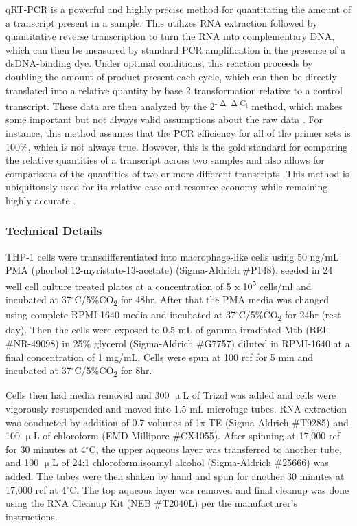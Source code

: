 qRT-PCR is a powerful and highly precise method for quantitating the amount of a transcript present in a sample. This utilizes RNA extraction followed by quantitative reverse transcription to turn the RNA into complementary DNA, which can then be measured by standard PCR amplification in the presence of a dsDNA-binding dye. Under optimal conditions, this reaction proceeds by doubling the amount of product present each cycle, which can then be directly translated into a relative quantity by base 2 transformation relative to a control transcript. These data are then analyzed by the 2\textsuperscript{-$\upDelta\upDelta$C\textsubscript{t}} method, which makes some important but not always valid assumptions about the raw data \citep{Livak2001, Cikos2007}. For instance, this method assumes that the PCR efficiency for all of the primer sets is 100\%, which is not always true. However, this is the gold standard for comparing the relative quantities of a transcript across two samples and also allows for comparisons of the quantities of two or more different transcripts. This method is ubiquitously used for its relative ease and resource economy while remaining highly accurate \citep{Dvinge2009, Perkins2012, Pabinger2014}.

\subsubsection{Technical Details}\label{rnaextraction}

THP-1 cells were transdifferentiated into macrophage-like cells using 50 ng/mL PMA (phorbol 12-myristate-13-acetate) (Sigma-Aldrich \#P148), seeded in 24 well cell culture treated plates at a concentration of 5 x 10\textsuperscript{5} cells/ml and incubated at 37$^{\circ}$C/5\%CO\textsubscript{2} for 48hr. After that the PMA media was changed using complete RPMI 1640 media and incubated at 37$^{\circ}$C/5\%CO\textsubscript{2} for 24hr (rest day). Then the cells were exposed to 0.5 mL of gamma-irradiated Mtb (BEI \#NR-49098) in 25\% glycerol (Sigma-Aldrich \#G7757) diluted in RPMI-1640 at a final concentration of 1 mg/mL. Cells were spun at 100 rcf for 5 min and incubated at 37$^{\circ}$C/5\%CO\textsubscript{2} for 8hr.

Cells then had media removed and 300 $\upmu$L of Trizol was added and cells were vigorously resuspended and moved into 1.5 mL microfuge tubes. RNA extraction was conducted by addition of 0.7 volumes of 1x TE (Sigma-Aldrich \#T9285) and 100 $\upmu$L of chloroform (EMD Millipore \#CX1055). After spinning at 17,000 rcf for 30 minutes at 4$^{\circ}$C, the upper aqueous layer was transferred to another tube, and 100 $\upmu$L of 24:1 chloroform:isoamyl alcohol (Sigma-Aldrich \#25666) was added. The tubes were then shaken by hand and spun for another 30 minutes at 17,000 rcf at 4$^{\circ}$C. The top aqueous layer was removed and final cleanup was done using the RNA Cleanup Kit (NEB \#T2040L) per the manufacturer's instructions.

